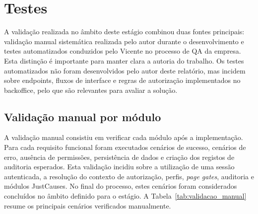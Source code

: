 
\section{Testes}
\label{sec:testes}

A validação realizada no âmbito deste estágio combinou duas fontes principais: validação manual sistemática realizada pelo autor durante o desenvolvimento e testes automatizados conduzidos pelo Vicente no processo de \gls{QA} da empresa. Esta distinção é importante para manter clara a autoria do trabalho. Os testes automatizados não foram desenvolvidos pelo autor deste relatório, mas incidem sobre endpoints, fluxos de interface e regras de autorização implementados no backoffice, pelo que são relevantes para avaliar a solução.

\subsection{Validação manual por módulo}
\label{subsec:testes_manual}

A validação manual consistiu em verificar cada módulo após a implementação. Para cada requisito funcional foram executados cenários de sucesso, cenários de erro, ausência de permissões, persistência de dados e criação dos registos de auditoria esperados. Esta validação incidiu sobre a utilização de uma sessão autenticada, a resolução do contexto de autorização, perfis, \textit{page gates}, auditoria e módulos JustCauses. No final do processo, estes cenários foram considerados concluídos no âmbito definido para o estágio. A Tabela~\ref{tab:validacao_manual} resume os principais cenários verificados manualmente.


